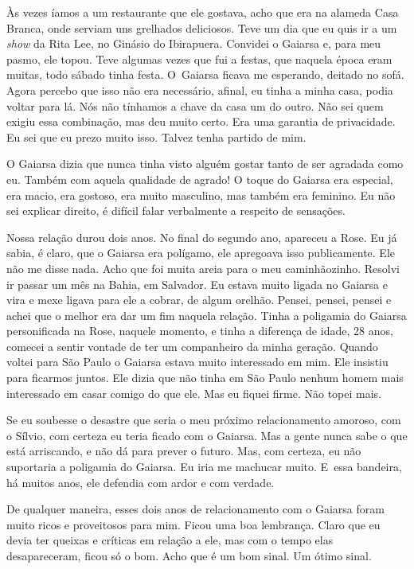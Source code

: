 Às vezes íamos a um restaurante que ele gostava, acho que era na alameda
Casa Branca, onde serviam uns grelhados deliciosos. Teve um dia que eu
quis ir a um \emph{show} da Rita Lee, no Ginásio do Ibirapuera. Convidei
o Gaiarsa e, para meu pasmo, ele topou. Teve algumas vezes que fui a
festas, que naquela época eram muitas, todo sábado tinha festa. O~Gaiarsa ficava me esperando, deitado no sofá. Agora percebo que isso não
era necessário, afinal, eu tinha a minha casa, podia voltar para lá. Nós
não tínhamos a chave da casa um do outro. Não sei quem exigiu essa
combinação, mas deu muito certo. Era uma garantia de privacidade. Eu sei
que eu prezo muito isso. Talvez tenha partido de mim.

O Gaiarsa dizia que nunca tinha visto alguém gostar tanto de ser
agradada como eu. Também com aquela qualidade de agrado! O
toque do Gaiarsa era especial, era macio, era gostoso, era muito
masculino, mas também era feminino. Eu não sei explicar direito, é
difícil falar verbalmente a respeito de sensações.

Nossa relação durou dois anos. No final do segundo ano, apareceu a Rose.
Eu já sabia, é claro, que o Gaiarsa era polígamo, ele apregoava isso
publicamente. Ele não me disse nada. Acho que foi muita areia para o meu
caminhãozinho. Resolvi ir passar um mês na Bahia, em Salvador. Eu estava
muito ligada no Gaiarsa e vira e mexe ligava para ele a cobrar, de algum
orelhão. Pensei, pensei, pensei e achei que o melhor era dar um fim
naquela relação. Tinha a poligamia do Gaiarsa personificada na Rose,
naquele momento, e tinha a diferença de idade, 28 anos, comecei a sentir
vontade de ter um companheiro da minha geração. Quando voltei para São
Paulo o Gaiarsa estava muito interessado em mim. Ele insistiu para
ficarmos juntos. Ele dizia que não tinha em São Paulo nenhum homem mais
interessado em casar comigo do que ele. Mas eu fiquei firme. Não topei
mais.

Se eu soubesse o desastre que seria o meu próximo relacionamento
amoroso, com o Sílvio, com certeza eu teria ficado com o Gaiarsa. Mas a
gente nunca sabe o que está arriscando, e não dá para prever o futuro.
Mas, com certeza, eu não suportaria a poligamia do Gaiarsa. Eu iria me
machucar muito. E~essa bandeira, há muitos anos, ele defendia com ardor
e com verdade.

De qualquer maneira, esses dois anos de relacionamento com o Gaiarsa
foram muito ricos e proveitosos para mim. Ficou uma boa lembrança. Claro
que eu devia ter queixas e críticas em relação a ele, mas com o tempo
elas desapareceram, ficou só o bom. Acho que é um bom sinal. Um ótimo
sinal.

